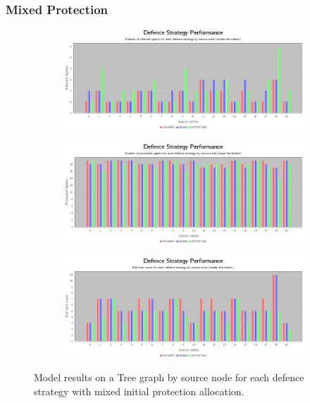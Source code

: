 \documentclass[results.tex]{subfiles}
\begin{document}
\newpage


\subsubsection{Mixed Protection}



\newpage

\begin{figure}[!ht]
\centering
     \begin{subfigure}[b]{0.9\textwidth}
         \centering
         \includegraphics[width=\textwidth]{Mixed/MixedInfectedChart}
         \label{fig:tree-mix-infected}
     \end{subfigure}
     \vfill
     \begin{subfigure}[b]{0.9\textwidth}
         \centering
         \includegraphics[width=\textwidth]{Mixed/MixedProtectedChart}
         \label{fig:tree-mix-protected}
     \end{subfigure}
     \vfill
     \begin{subfigure}[b]{0.9\textwidth}
         \centering
         \includegraphics[width=\textwidth]{Mixed/MixedEndTurnChart}
         \label{fig:tree-mix-end}
     \end{subfigure}
        \caption{Model results on a Tree graph by source node for each defence strategy with mixed initial protection allocation.}
        \label{fig:tree-mix-charts}
\end{figure}
\end{document}
